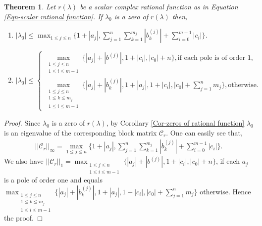 \documentclass[12pt, reqno]{amsart}
\newtheorem{theorem}{Theorem}[section]
\theoremstyle{definition}
\theoremstyle{remark}
\numberwithin{equation}{section}
\begin{document}
\begin{theorem}\label{Thm-bounds for zeros using norms}
Let $r(\lambda)$ be a scalar complex rational function as in Equation 
\eqref{Eqn-scalar rational function}. If $\lambda_0$ is a zero of $r(\lambda)$ then,
\begin{enumerate}
\item $\displaystyle  |\lambda_0| \leq \max_{1 \leq j \leq n} \bigg\{1+|a_j|, 
\sum_{j=1}^{n} \sum_{k=1}^{m_j}|b_k^{(j)}|+ \sum_{i=0}^{m-1}|c_i| \bigg\}$.

\item {\small
 \[
|\lambda_0| \leq 
\begin{cases}
\max_{\substack{1 \leq j \leq n \\ 1 \leq i \leq m-1}} \bigg\{|a_j| + |b^{(j)}|, 
1 + |c_i|, |c_0| + n \bigg\}, \text{if each pole is of order $1$}, \\
\max_{\substack{1 \leq j \leq n \\ 1 \leq k \leq m_j \\ 1 \leq i \leq m-1}} 
\bigg\{|a_j| + |b_k^{(j)}|, 1 + |a_j|, 1 + |c_i|, |c_0| + \sum_{j=1}^{n}m_j \bigg\},  
\text{otherwise}.
\end{cases}
\]}


\end{enumerate}
\end{theorem}

\begin{proof}
Since $\lambda_0$ is a zero of $r(\lambda)$, by Corollary \ref{Cor-zeros of rational function} 
$\lambda_0$ is an eigenvalue of the corresponding block matrix $\mathcal{C}_r$. One 
can easily see that, 
\begin{align*}
||\mathcal{C}_r||_\infty \displaystyle= \max_{1 \leq j \leq n} \bigg\{1+|a_j|, 
\sum_{j=1}^{n} \sum_{k=1}^{m_j}|b_k^{(j)}|+ \sum_{i=0}^{m-1}|c_i| \bigg\}.
\end{align*}
We also have 
$||\mathcal{C}_r||_1 \displaystyle = \max_{\substack{1 \leq j \leq n \\ 1 \leq i \leq m-1}} 
\bigg\{|a_j|+|b^{(j)}|, 1+|c_i|, |c_0|+ n 
\bigg\}$, if each $a_j$ is a pole of order one and equals 
$\displaystyle \max_{\substack{1 \leq j \leq n \\ 1 \leq k \leq m_j\\ 1 \leq i 
\leq m-1}} \bigg\{|a_j|+|b_k^{(j)}|, 1+|a_j|, 1+|c_i|, |c_0|+ \sum_{j=1}^{n}m_j \bigg\}$ 
otherwise. Hence the proof.
\end{proof}
\end{document}
